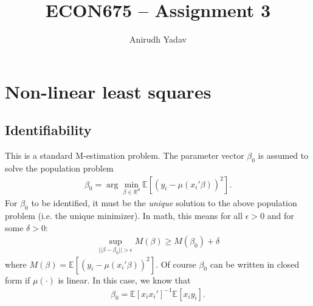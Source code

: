 \documentclass[12pt]{article}
\title{ECON675 -- Assignment 3}
\author{Anirudh Yadav}
\newcommand{\R}{\mathbb{R}}
\newcommand{\E}{\mathbb{E}}
\newcommand{\e}{\epsilon}
\newcommand{\mtx}[1]{\ensuremath{\bm{\mathit{#1}}}}
\begin{document}
\maketitle

\setcounter{tocdepth}{2}
\tableofcontents

\section{Non-linear least squares}

\subsection{Identifiability}
This is a standard M-estimation problem. The parameter vector $\mtx{\beta}_0$ is assumed to solve the population problem
\begin{align*}
\mtx{\beta}_0 = \arg \min_{\beta \in \R^d} \E[(y_i - \mu(\mtx{x}_i'\mtx{\beta}))^2].
\end{align*}
For $\mtx{\beta}_0$ to be identified, it must be the \textit{unique} solution to the above population problem (i.e. the unique minimizer). In math, this means for all $\e>0$ and for some $\delta >0$:
\begin{align*}
\sup_{|| \beta - \beta_0 || > \e} M(\mtx{\beta}) \geq M(\mtx{\beta}_0) + \delta
\end{align*}
where $M(\mtx{\beta}) = \E[(y_i - \mu(\mtx{x}_i'\mtx{\beta}))^2]$. Of course $\mtx{\beta}_0$ can be written in closed form if $\mu(\cdot)$ is linear. In this case, we know that 
\begin{align*}
\mtx{\beta}_0= \E[\mtx{x}_i\mtx{x}_i']^{-1}\E[\mtx{x}_iy_i].
\end{align*}
\end{document}

